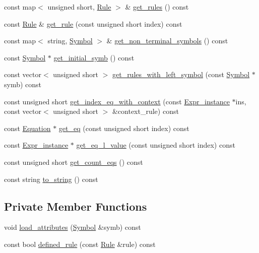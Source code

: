 \begin{CompactItemize}
const map$<$ unsigned short, \hyperlink{classgenevalmag_1_1Rule}{Rule} $>$ \& \hyperlink{classgenevalmag_1_1Attr__grammar_41be9d108df7f8159bd989a5c174be87}{get\_\-rules} () const 
\item 
const \hyperlink{classgenevalmag_1_1Rule}{Rule} \& \hyperlink{classgenevalmag_1_1Attr__grammar_3452d5ee579a9985a52edcf6a97678d5}{get\_\-rule} (const unsigned short index) const 
\item 
const map$<$ string, \hyperlink{classgenevalmag_1_1Symbol}{Symbol} $>$ \& \hyperlink{classgenevalmag_1_1Attr__grammar_50a326649bbf48d2d715144cef59a75e}{get\_\-non\_\-terminal\_\-symbols} () const 
\item 
const \hyperlink{classgenevalmag_1_1Symbol}{Symbol} $\ast$ \hyperlink{classgenevalmag_1_1Attr__grammar_5a476aa583e3f9e1bbfe182b5ee2f759}{get\_\-initial\_\-symb} () const 
\item 
const vector$<$ unsigned short $>$ \hyperlink{classgenevalmag_1_1Attr__grammar_0f88798aa739681bf39c2620b1f39069}{get\_\-rules\_\-with\_\-left\_\-symbol} (const \hyperlink{classgenevalmag_1_1Symbol}{Symbol} $\ast$symb) const 
\item 
const unsigned short \hyperlink{classgenevalmag_1_1Attr__grammar_47242caf1e804a8fc50e0ab75ea39570}{get\_\-index\_\-eq\_\-with\_\-context} (const \hyperlink{classgenevalmag_1_1Expr__instance}{Expr\_\-instance} $\ast$ins, const vector$<$ unsigned short $>$ \&context\_\-rule) const 
\item 
const \hyperlink{classgenevalmag_1_1Equation}{Equation} $\ast$ \hyperlink{classgenevalmag_1_1Attr__grammar_8a1e41dee53587c04675a3a46df941af}{get\_\-eq} (const unsigned short index) const 
\item 
const \hyperlink{classgenevalmag_1_1Expr__instance}{Expr\_\-instance} $\ast$ \hyperlink{classgenevalmag_1_1Attr__grammar_9d743d32f7ecb1f31284d04db9e3051e}{get\_\-eq\_\-l\_\-value} (const unsigned short index) const 
\item 
const unsigned short \hyperlink{classgenevalmag_1_1Attr__grammar_d94a52850c818a1f74fc81af99b0d52d}{get\_\-count\_\-eqs} () const 
\item 
const string \hyperlink{classgenevalmag_1_1Attr__grammar_d2f2da693afe958a6dc84078c391100e}{to\_\-string} () const 
\end{CompactItemize}
\subsection*{Private Member Functions}
\begin{CompactItemize}
\item 
void \hyperlink{classgenevalmag_1_1Attr__grammar_faa4c9d59c02bb170691cad72bf97c68}{load\_\-attributes} (\hyperlink{classgenevalmag_1_1Symbol}{Symbol} \&symb) const 
\item 
const bool \hyperlink{classgenevalmag_1_1Attr__grammar_3d7a28dbbd12cbfc7a0bb41a7f8b8ab7}{defined\_\-rule} (const \hyperlink{classgenevalmag_1_1Rule}{Rule} \&rule) const 
\end{CompactItemize}
